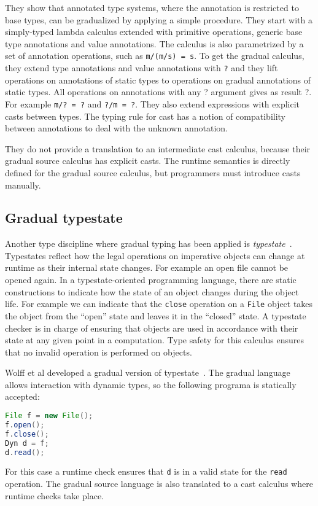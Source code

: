 \documentclass{article}
\newcommand{\quotes}[1]{``#1''}
\newcommand\icode[1]{\texttt{#1}}
\begin{document}
They show that annotated type systems, where the annotation is restricted to base types, can be gradualized by applying a simple procedure. They start with a simply-typed lambda calculus extended with primitive operations, generic base type annotations and value annotations. The calculus is also parametrized by a set of annotation operations, such as \icode{m/(m/s) = s}. To get the gradual calculus, they extend type annotations and value annotations with \icode{?} and they lift operations on annotations of static types to operations on gradual annotations of static types. All operations on annotations with any ? argument gives as result ?. For example \icode{m/? = ?} and \icode{?/m = ?}. They also extend expressions with explicit casts between types. The typing rule for cast has a notion of compatibility between annotations to deal with the unknown annotation. 

They do not provide a translation to an intermediate cast calculus, because their gradual source calculus has explicit casts. The runtime semantics is directly defined for the gradual source calculus, but programmers must introduce casts manually.

\subsection{Gradual typestate}
Another type discipline where gradual typing has been applied is \textit{typestate}~\cite{strom:tse86}. Typestates reflect how the legal operations on imperative objects can change at runtime as their internal state changes. For example an open file cannot be opened again. In a typestate-oriented programming language, there are static constructions to indicate how the state of an object changes during the object life. For example we can indicate that the \icode{close} operation on a \icode{File} object takes the object from the \quotes{open} state and leaves it in the \quotes{closed} state. A typestate checker is in charge of ensuring that objects are used in accordance with their state at any given point in a computation. Type safety for this calculus ensures that no invalid operation is performed on objects.

Wolff et al developed a gradual version of typestate~\cite{wolffAl:ecoop2011, garciaAl:toplas2014}. The gradual language allows interaction with dynamic types, so the following programa is statically accepted:
\begin{lstlisting}[language=Java]
File f = new File();
f.open();
f.close();
Dyn d = f;
d.read();
\end{lstlisting}
For this case a runtime check ensures that \icode{d} is in a valid state for the \icode{read} operation. The gradual source language is also translated to a cast calculus where runtime checks take place.
\end{document}

